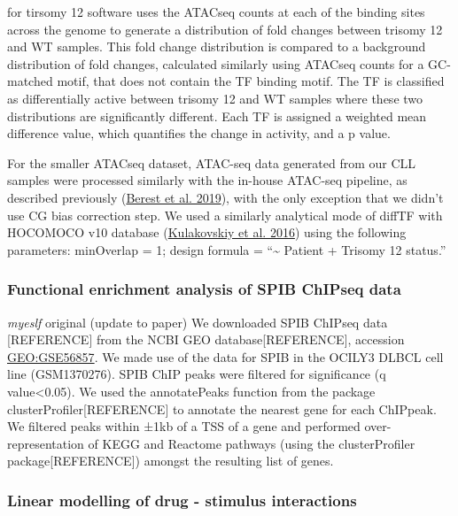 \documentclass[11pt, a4paper, twosided]{book}
\begin{document}
for tirsomy 12 software uses the ATACseq counts at each of the binding sites across the genome to generate a distribution of fold changes between trisomy 12 and WT samples. This fold change distribution is compared to a background distribution of fold changes, calculated similarly using ATACseq counts for a GC-matched motif, that does not contain the TF binding motif. The TF is classified as differentially active between trisomy 12 and WT samples where these two distributions are significantly different. Each TF is assigned a weighted mean difference value, which quantifies the change in activity, and a p value.

For the smaller ATACseq dataset, ATAC-seq data generated from our CLL samples were processed similarly with the in-house ATAC-seq pipeline, as described previously (\protect\hyperlink{ref-Berest2019}{Berest et al. 2019}), with the only exception that we didn't use CG bias correction step. We used a similarly analytical mode of diffTF with HOCOMOCO v10 database (\protect\hyperlink{ref-HOCOMOCO}{Kulakovskiy et al. 2016}) using the following parameters: minOverlap = 1; design formula = ``\textasciitilde{} Patient + Trisomy 12 status.''

\hypertarget{functional-enrichment-analysis-of-spib-chipseq-data}{%
\subsubsection{Functional enrichment analysis of SPIB ChIPseq data}\label{functional-enrichment-analysis-of-spib-chipseq-data}}

\emph{myeslf} original (update to paper)
We downloaded SPIB ChIPseq data {[}REFERENCE{]} from the NCBI GEO database{[}REFERENCE{]}, accession \url{GEO:GSE56857}. We made use of the data for SPIB in the OCILY3 DLBCL cell line (GSM1370276). SPIB ChIP peaks were filtered for significance (q value\textless0.05). We used the annotatePeaks function from the package clusterProfiler{[}REFERENCE{]} to annotate the nearest gene for each ChIPpeak. We filtered peaks within ±1kb of a TSS of a gene and performed over-representation of KEGG and Reactome pathways (using the clusterProfiler package{[}REFERENCE{]}) amongst the resulting list of genes.

\hypertarget{linear-modelling-of-drug---stimulus-interactions-1}{%
\subsubsection{Linear modelling of drug - stimulus interactions}\label{linear-modelling-of-drug---stimulus-interactions-1}}
\end{document}
